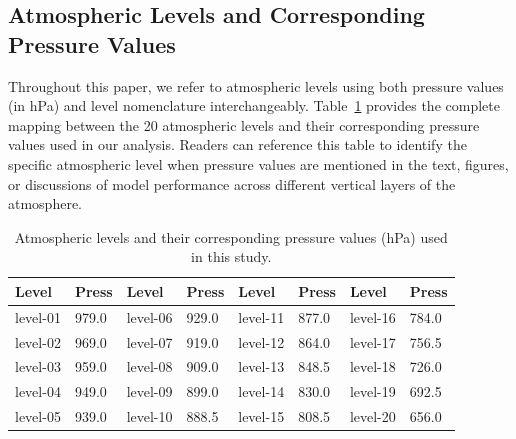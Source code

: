 \documentclass[11pt]{article}
\begin{document}
    \subsection{Atmospheric Levels and Corresponding Pressure Values}
        Throughout this paper, we refer to atmospheric levels using both pressure values (in hPa) and level nomenclature interchangeably. Table~\ref{tab:pressure_levels} provides the complete mapping between the 20 atmospheric levels and their corresponding pressure values used in our analysis. Readers can reference this table to identify the specific atmospheric level when pressure values are mentioned in the text, figures, or discussions of model performance across different vertical layers of the atmosphere.

        \begin{table}[htbp]
            \centering
            \caption{Atmospheric levels and their corresponding pressure values (hPa) used in this study.}
            \label{tab:pressure_levels}
            \begin{tabular}{llllllll}
            \hline
            Level & Press & Level & Press & Level & Press & Level & Press \\
            \hline
            level-01 & 979.0 & level-06 & 929.0 & level-11 & 877.0 & level-16 & 784.0 \\
            level-02 & 969.0 & level-07 & 919.0 & level-12 & 864.0 & level-17 & 756.5 \\
            level-03 & 959.0 & level-08 & 909.0 & level-13 & 848.5 & level-18 & 726.0 \\
            level-04 & 949.0 & level-09 & 899.0 & level-14 & 830.0 & level-19 & 692.5 \\
            level-05 & 939.0 & level-10 & 888.5 & level-15 & 808.5 & level-20 & 656.0 \\
            \hline
            \end{tabular}
        \end{table}
\end{document}
